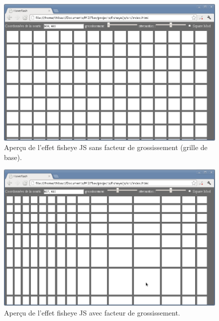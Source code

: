 \begin{figure}[H]
  \centering
  \includegraphics[width=\textwidth]{../resources/illustrations/js_screen_1}
  \caption{Aperçu de l'effet fisheye JS sans facteur de grossissement (grille de base).}
  \label{fig:js_6}
\end{figure}
\begin{minipage}[H]{.5\textwidth}
\begin{figure}[H]
  \centering
  \includegraphics[width=\textwidth]{../resources/illustrations/js_screen_2}
  \caption{Aperçu de l'effet fisheye JS avec facteur de grossissement.}
  \label{fig:js_6}
\end{figure}
\end{minipage}
